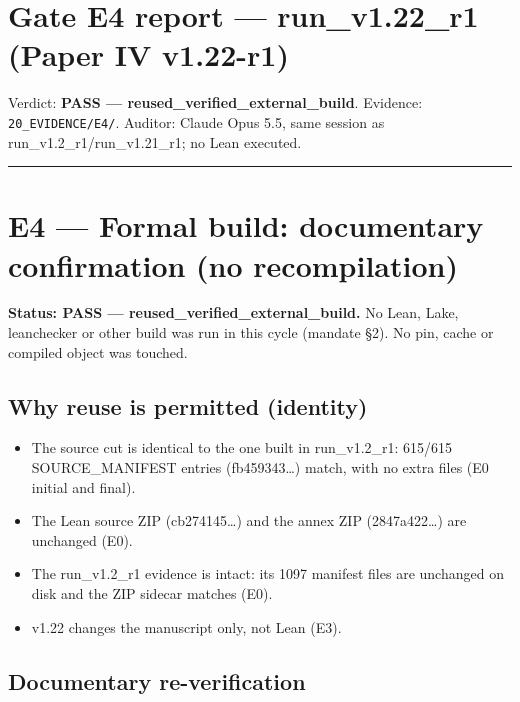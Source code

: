 \documentclass[
]{article}
\author{}
\date{}
\providecommand{\tightlist}{%
  \setlength{\itemsep}{0pt}\setlength{\parskip}{0pt}}
\begin{document}
\section{Gate E4 report --- run\_v1.22\_r1 (Paper IV
v1.22-r1)}\label{gate-e4-report--run_v122_r1-paper-iv-v122-r1}

Verdict: \textbf{PASS --- reused\_verified\_external\_build}. Evidence:
\texttt{20\_EVIDENCE/E4/}. Auditor: Claude Opus 5.5, same session as
run\_v1.2\_r1/run\_v1.21\_r1; no Lean executed.

\begin{center}\rule{0.5\linewidth}{0.5pt}\end{center}

\section{E4 --- Formal build: documentary confirmation (no
recompilation)}\label{e4--formal-build-documentary-confirmation-no-recompilation}

\textbf{Status: PASS --- reused\_verified\_external\_build.} No Lean,
Lake, leanchecker or other build was run in this cycle (mandate §2). No
pin, cache or compiled object was touched.

\subsection{Why reuse is permitted
(identity)}\label{why-reuse-is-permitted-identity}

\begin{itemize}
\tightlist
\item
  The source cut is identical to the one built in run\_v1.2\_r1: 615/615
  SOURCE\_MANIFEST entries (fb459343\ldots) match, with no extra files
  (E0 initial and final).
\item
  The Lean source ZIP (cb274145\ldots) and the annex ZIP
  (2847a422\ldots) are unchanged (E0).
\item
  The run\_v1.2\_r1 evidence is intact: its 1097 manifest files are
  unchanged on disk and the ZIP sidecar matches (E0).
\item
  v1.22 changes the manuscript only, not Lean (E3).
\end{itemize}

\subsection{Documentary
re-verification}\label{documentary-re-verification}
\end{document}

